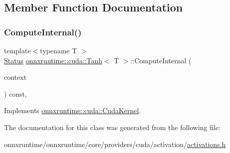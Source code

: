 \subsection{Member Function Documentation}
\mbox{\label{classonnxruntime_1_1cuda_1_1Tanh_a7e741dd0d0ef94247a60a3d66db5857f}} 
\subsubsection{\texorpdfstring{Compute\+Internal()}{ComputeInternal()}}
{\footnotesize\ttfamily template$<$typename T $>$ \\
\mbox{\hyperlink{classonnxruntime_1_1common_1_1Status}{Status}} \mbox{\hyperlink{classonnxruntime_1_1cuda_1_1Tanh}{onnxruntime\+::cuda\+::\+Tanh}}$<$ T $>$\+::Compute\+Internal (\begin{DoxyParamCaption}\item[{\mbox{\hyperlink{classonnxruntime_1_1OpKernelContext}{Op\+Kernel\+Context}} $\ast$}]{context }\end{DoxyParamCaption}) const\hspace{0.3cm}{\ttfamily [override]}, {\ttfamily [virtual]}}



Implements \mbox{\hyperlink{classonnxruntime_1_1cuda_1_1CudaKernel_aca7af04ae448017d6023d30bba231ebb}{onnxruntime\+::cuda\+::\+Cuda\+Kernel}}.



The documentation for this class was generated from the following file\+:\begin{DoxyCompactItemize}
\item 
onnxruntime/onnxruntime/core/providers/cuda/activation/\mbox{\hyperlink{cuda_2activation_2activations_8h}{activations.\+h}}\end{DoxyCompactItemize}
